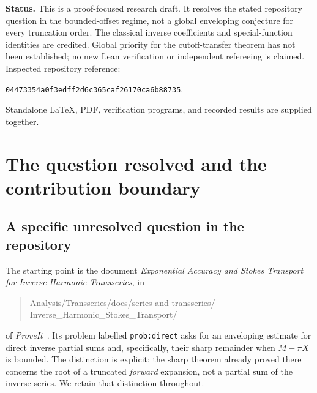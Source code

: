 \documentclass[11pt,a4paper]{article}
\theoremstyle{definition}
\numberwithin{equation}{section}
\newcommand{\e}{\mathrm e}
\newcommand{\Oh}{\mathcal O}
\newcommand{\repo}{\textit{ProveIt}}
\begin{document}
\begin{titlepage}
\begin{abstract}
For $\psi(W(X)+\tfrac12)=\log X$ and its direct inverse partial sum $S_M(X)$, put $\sigma=M+1-\pi X$. Uniformly for bounded $\sigma$, we obtain
\[
 S_M-W=(-1)^M\sqrt X\,\e^{-2\pi X}
 \left[1+\frac1X\left\{-\frac\pi{12}
 +\frac{2\sigma^2-3\sigma+7/12}{2\pi}\right\}
 +\Oh(X^{-2})\right].
\]
We prove a complete, effectively computable expansion of its algebraic amplitude, display the second correction, and obtain an eventual signed first-omitted-term bound in the least-term window. A corrected adjacent-partial-sum average improves the error by any prescribed fixed algebraic factor without solving a truncated nonlinear equation. Exact-rational shifted-digamma certificates and 312-digit numerical checks accompany the proofs.
\end{abstract}
\vspace{3mm}
\noindent\textbf{Status.} This is a proof-focused research draft. It resolves the stated repository question in the bounded-offset regime, not a global enveloping conjecture for every truncation order. The classical inverse coefficients and special-function identities are credited. Global priority for the cutoff-transfer theorem has not been established; no new Lean verification or independent refereeing is claimed.
\vfill
\noindent\small Inspected repository reference:\par
\noindent\small\texttt{04473354a0f3edff2d6c365caf26170ca6b88735}.\par
\noindent\small Standalone LaTeX, PDF, verification programs, and recorded results are supplied together.
\end{titlepage}
\hypersetup{pageanchor=true}
\begingroup
\small\setlength{\parskip}{0pt}
\tableofcontents
\endgroup
\newpage

\section{The question resolved and the contribution boundary}
\label{sec:scope}

\subsection{A specific unresolved question in the repository}
The starting point is the document \emph{Exponential Accuracy and Stokes Transport for Inverse Harmonic Transseries}, in
\begin{quote}\small\ttfamily
Analysis/Transseries/docs/series-and-transseries/\\
Inverse\_Harmonic\_Stokes\_Transport/
\end{quote}
of \repo\ \cite{prior,group}. Its problem labelled \texttt{prob:direct} asks for an enveloping estimate for direct inverse partial sums and, specifically, their sharp remainder when $M-\pi X$ is bounded. The distinction is explicit: the sharp theorem already proved there concerns the root of a truncated \emph{forward} expansion, not a partial sum of the inverse series. We retain that distinction throughout.
\end{document}
